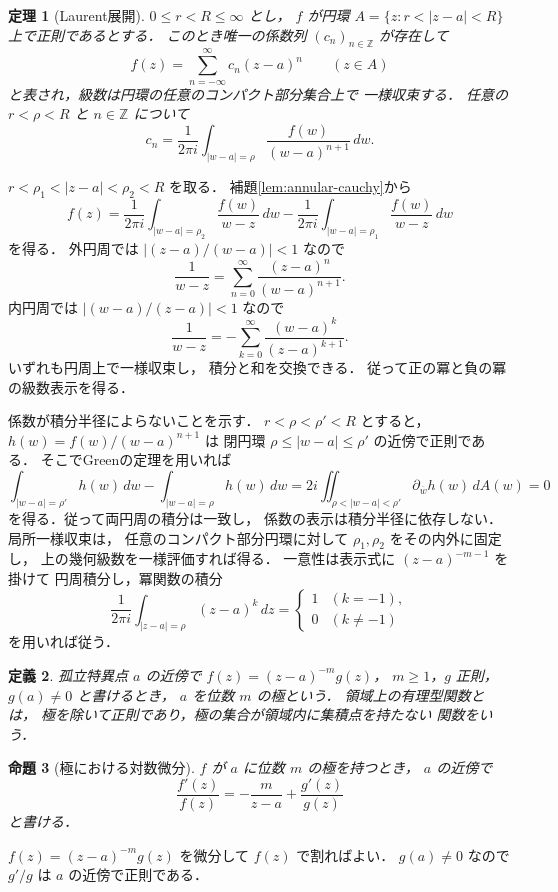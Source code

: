 \documentclass[a5paper,10pt,onecolumn]{jsarticle}
\makeatletter
\theoremstyle{mathnotetheorem}
\newtheorem{theorem}{定理}[section]
\newtheorem{definition}[theorem]{定義}
\newtheorem{proposition}[theorem]{命題}
\renewcommand{\proofname}{証明}
\renewenvironment{proof}[1][\proofname]{%
  \par\pushQED{\qed}\normalfont\topsep4\p@\@plus2\p@\relax
  \trivlist\item[\hskip\labelsep\bfseries #1]\ignorespaces
}{\popQED\endtrivlist\@endpefalse}
\makeatother
\begin{document}
\begin{theorem}[Laurent展開]\label{thm:laurent}
$0\le r<R\le\infty$ とし，
$f$ が円環
$A=\{z:r<|z-a|<R\}$ 上で正則であるとする．
このとき唯一の係数列 $(c_n)_{n\in\mathbb Z}$ が存在して
\[
 f(z)=\sum_{n=-\infty}^\infty c_n(z-a)^n
 \qquad(z\in A)
\]
と表され，級数は円環の任意のコンパクト部分集合上で
一様収束する．
任意の $r<\rho<R$ と $n\in\mathbb Z$ について
\[
 c_n=\frac1{2\pi i}
 \int_{|w-a|=\rho}\frac{f(w)}{(w-a)^{n+1}}\,dw.
\]
\end{theorem}
\begin{proof}
$r<\rho_1<|z-a|<\rho_2<R$ を取る．
補題\ref{lem:annular-cauchy}から
\[
 f(z)=\frac1{2\pi i}\int_{|w-a|=\rho_2}
       \frac{f(w)}{w-z}\,dw
      -\frac1{2\pi i}\int_{|w-a|=\rho_1}
       \frac{f(w)}{w-z}\,dw
\]
を得る．
外円周では $|(z-a)/(w-a)|<1$ なので
\[
 \frac1{w-z}
 =\sum_{n=0}^\infty\frac{(z-a)^n}{(w-a)^{n+1}}.
\]
内円周では $|(w-a)/(z-a)|<1$ なので
\[
 \frac1{w-z}
 =-\sum_{k=0}^\infty\frac{(w-a)^k}{(z-a)^{k+1}}.
\]
いずれも円周上で一様収束し，
積分と和を交換できる．
従って正の冪と負の冪の級数表示を得る．

係数が積分半径によらないことを示す．
$r<\rho<\rho'<R$ とすると，
$h(w)=f(w)/(w-a)^{n+1}$ は
閉円環 $\rho\le|w-a|\le\rho'$ の近傍で正則である．
そこでGreenの定理を用いれば
\[
 \int_{|w-a|=\rho'}h(w)\,dw
 -\int_{|w-a|=\rho}h(w)\,dw
 =2i\iint_{\rho<|w-a|<\rho'}
       \partial_{\overline w}h(w)\,dA(w)=0
\]
を得る．従って両円周の積分は一致し，
係数の表示は積分半径に依存しない．
局所一様収束は，
任意のコンパクト部分円環に対して
$\rho_1,\rho_2$ をその内外に固定し，
上の幾何級数を一様評価すれば得る．
一意性は表示式に $(z-a)^{-m-1}$ を掛けて
円周積分し，冪関数の積分
\[
 \frac1{2\pi i}\int_{|z-a|=\rho}(z-a)^k\,dz
 =\begin{cases}1&(k=-1),\\0&(k\ne-1)\end{cases}
\]
を用いれば従う．
\end{proof}

\begin{definition}
孤立特異点 $a$ の近傍で
$f(z)=(z-a)^{-m}g(z)$，
$m\ge1$，$g$ 正則，$g(a)\ne0$ と書けるとき，
$a$ を位数 $m$ の\emph{極}という．
領域上の有理型関数とは，
極を除いて正則であり，極の集合が領域内に集積点を持たない
関数をいう．
\end{definition}

\begin{proposition}[極における対数微分]\label{prop:pole}
$f$ が $a$ に位数 $m$ の極を持つとき，
$a$ の近傍で
\[
 \frac{f'(z)}{f(z)}
 =-\frac{m}{z-a}+\frac{g'(z)}{g(z)}
\]
と書ける．
\end{proposition}
\begin{proof}
$f(z)=(z-a)^{-m}g(z)$ を微分して
$f(z)$ で割ればよい．
$g(a)\ne0$ なので $g'/g$ は $a$ の近傍で正則である．
\end{proof}
\end{document}
